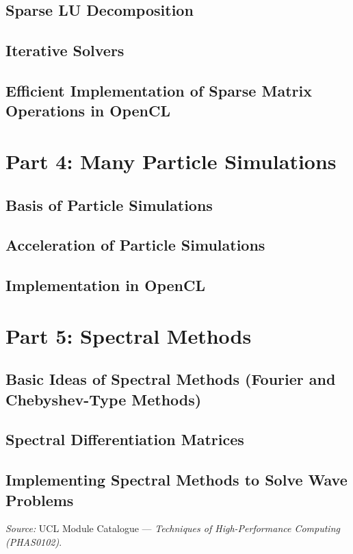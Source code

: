 \documentclass[12pt]{article}
\begin{document}
\subsection{Sparse LU Decomposition}
\subsection{Iterative Solvers}
\subsection{Efficient Implementation of Sparse Matrix Operations in OpenCL}

\section{Part 4: Many Particle Simulations}
\subsection{Basis of Particle Simulations}
\subsection{Acceleration of Particle Simulations}
\subsection{Implementation in OpenCL}

\section{Part 5: Spectral Methods}
\subsection{Basic Ideas of Spectral Methods (Fourier and Chebyshev-Type Methods)}
\subsection{Spectral Differentiation Matrices}
\subsection{Implementing Spectral Methods to Solve Wave Problems}

\vfill
\noindent\textit{Source:} UCL Module Catalogue --- \emph{Techniques of High-Performance Computing (PHAS0102)}. 
\end{document}
